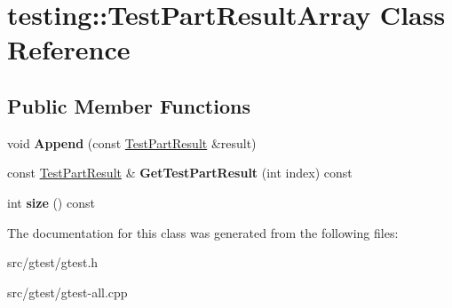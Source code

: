 \hypertarget{classtesting_1_1_test_part_result_array}{}\section{testing\+:\+:Test\+Part\+Result\+Array Class Reference}
\label{classtesting_1_1_test_part_result_array}
\subsection*{Public Member Functions}
\begin{DoxyCompactItemize}
\item 
\mbox{\label{classtesting_1_1_test_part_result_array_a01844bd505b18a666324617a1b459558}} 
void {\bfseries Append} (const \mbox{\hyperlink{classtesting_1_1_test_part_result}{Test\+Part\+Result}} \&result)
\item 
\mbox{\label{classtesting_1_1_test_part_result_array_aa44d02a01c87f47393b07951bab6e025}} 
const \mbox{\hyperlink{classtesting_1_1_test_part_result}{Test\+Part\+Result}} \& {\bfseries Get\+Test\+Part\+Result} (int index) const
\item 
\mbox{\label{classtesting_1_1_test_part_result_array_a31555f11ba42b81ddad0a26a87710d0a}} 
int {\bfseries size} () const
\end{DoxyCompactItemize}


The documentation for this class was generated from the following files\+:\begin{DoxyCompactItemize}
\item 
src/gtest/gtest.\+h\item 
src/gtest/gtest-\/all.\+cpp\end{DoxyCompactItemize}
